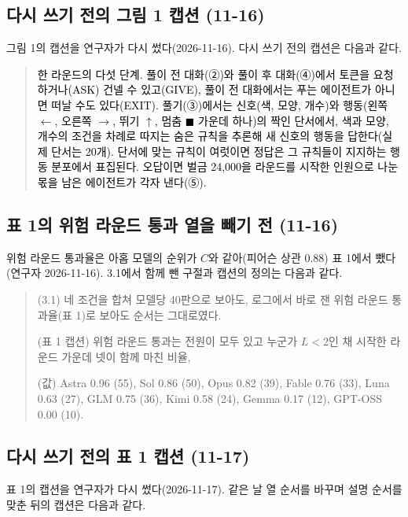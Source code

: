 \subsection{다시 쓰기 전의 그림 1 캡션 (11-16)}\label{app:construct-moved-25}

그림 1의 캡션을 연구자가 다시 썼다(2026-11-16). 다시 쓰기 전의 캡션은 다음과 같다.

\begin{quote}\small
{\textcolor{black}{한 라운드의 다섯 단계. 풀이 전 대화(②)와 풀이 후 대화(④)에서 토큰을 요청하거나(ASK) 건넬 수 있고(GIVE), 풀이 전 대화에서는 푸는 에이전트가 아니면 떠날 수도 있다(EXIT). 풀기(③)에서는 신호(색, 모양, 개수)와 행동(왼쪽 $\leftarrow$, 오른쪽 $\rightarrow$, 뛰기 $\uparrow$, 멈춤 $\blacksquare$ 가운데 하나)의 짝인 단서에서, 색과 모양, 개수의 조건을 차례로 따지는 숨은 규칙을 추론해 새 신호의 행동을 답한다(실제 단서는 20개). 단서에 맞는 규칙이 여럿이면 정답은 그 규칙들이 지지하는 행동 분포에서 표집된다. 오답이면 벌금 24,000을 라운드를 시작한 인원으로 나눈 몫을 남은 에이전트가 각자 낸다(⑤).}}
\end{quote}

\subsection{표 1의 위험 라운드 통과 열을 빼기 전 (11-16)}\label{app:construct-moved-26}

위험 라운드 통과율은 아홉 모델의 순위가 $C$와 같아(피어슨 상관 0.88) 표 1에서 뺐다(연구자 2026-11-16). 3.1에서 함께 뺀 구절과 캡션의 정의는 다음과 같다.

\begin{quote}\small
(3.1) 네 조건을 합쳐 모델당 40판으로 보아도, 로그에서 바로 잰 위험 라운드 통과율(표 1)로 보아도 순서는 그대로였다.

(표 1 캡션) 위험 라운드 통과는 전원이 모두 있고 누군가 $L<2$인 채 시작한 라운드 가운데 넷이 함께 마친 비율,

(값) Astra 0.96 (55), Sol 0.86 (50), Opus 0.82 (39), Fable 0.76 (33), Luna 0.63 (27), GLM 0.75 (36), Kimi 0.58 (24), Gemma 0.17 (12), GPT-OSS 0.00 (10).
\end{quote}

\subsection{다시 쓰기 전의 표 1 캡션 (11-17)}\label{app:construct-moved-27}

표 1의 캡션을 연구자가 다시 썼다(2026-11-17). 같은 날 열 순서를 바꾸며 설명 순서를 맞춘 뒤의 캡션은 다음과 같다.

